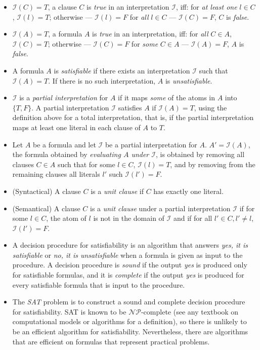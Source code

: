 \documentclass[11pt]{report}
\begin{document}
\begin{itemize}
\item $\mathcal{I}(C)=T$, a clause $C$ is \emph{true} in an
interpretation $\mathcal{I}$, iff: for \emph{at least one} $l\in C$,
$\mathcal{I}(l)=T$; otherwise --- $\mathcal{I}(l)=F$ for \emph{all}
$l\in C$ --- $\mathcal{I}(C)=F$, $C$ is \emph{false}.

\item $\mathcal{I}(A)=T$, a formula $A$ is \emph{true} in an
interpretation, iff: for \emph{all} $C\in A$, $\mathcal{I}(C)=T$;
otherwise --- $\mathcal{I}(C)=F$ for \emph{some} $C\in A$ ---
$\mathcal{I}(A)=F$, $A$ is \emph{false}.

\item A formula $A$ is \emph{satisfiable} if there exists an
interpretation $\mathcal{I}$ such that $\mathcal{I}(A)=T$. If there is
no such interpretation, $A$ is \emph{unsatisfiable}.

\item $\mathcal{I}$ is a \emph{partial interpretation} for $A$ if it
maps \emph{some} of the atoms in $A$ into $\{T,F\}$. A partial
interpretation $\mathcal{I}$ satisfies $A$ if $\mathcal{I}(A)=T$, using
the definition above for a total interpretation, that is, if the partial
interpretation maps at least one literal in each clause of $A$ to $T$.

\item Let $A$ be a formula and let $\mathcal{I}$ be a partial
interpretation for $A$. $A'=\mathcal{I}(A)$, the formula obtained by
\emph{evaluating $A$ under $\mathcal{I}$}, is obtained by removing all
clauses $C\in A$ such that for some $l\in C$, $\mathcal{I}(l)=T$, and by
removing from the remaining clauses all literals $l'$ such
$\mathcal{I}(l')=F$.

\item (Syntactical) A clause $C$ is a \emph{unit clause} if $C$
has exactly one literal.

\item (Semantical) A clause $C$ is a \emph{unit clause} under a partial
interpretation $\mathcal{I}$ if for some $l\in C$, the atom of $l$
is not in the domain of $\mathcal{I}$ and if for all $l'\in C, l'\neq l$,
$\mathcal{I}(l')=F$.

\item A decision procedure for satisfiability is an algorithm that
answers \emph{yes, it is satisfiable} or \emph{no, it is unsatisfiable}
when a formula is given as input to the procedure. A decision procedure
is \emph{sound} if the output \emph{yes} is produced only for
satisfiable formulas, and it is \emph{complete} if the output \emph{yes}
is produced for every satisfiable formula that is input to the
procedure.

\item The \emph{SAT} problem is to construct a sound and complete
decision procedure for satisfiability. SAT is known to be
$\mathcal{NP}$-complete (see any textbook on computational models or
algorithms for a definition), so there is unlikely to be an efficient
algorithm for satisfiability. Nevertheless, there are algorithms that
are efficient on formulas that represent practical problems.

\end{itemize}
\end{document}
